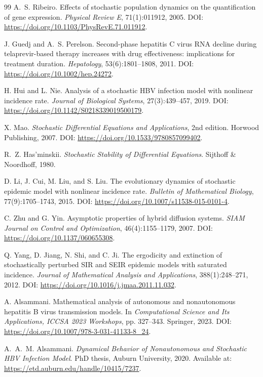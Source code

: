 \documentclass{article}
\begin{document}
\begin{thebibliography}{99}
A.~S. Ribeiro.
\newblock Effects of stochastic population dynamics on the quantification of gene expression.
\newblock \emph{Physical Review E}, 71(1):011912, 2005. DOI: \url{https://doi.org/10.1103/PhysRevE.71.011912}.

J. Guedj and A.~S. Perelson.
\newblock Second-phase hepatitis C virus RNA decline during telaprevir-based therapy increases with drug effectiveness: implications for treatment duration.
\newblock \emph{Hepatology}, 53(6):1801--1808, 2011. DOI: \url{https://doi.org/10.1002/hep.24272}.

H. Hui and L. Nie.
\newblock Analysis of a stochastic HBV infection model with nonlinear incidence rate.
\newblock \emph{Journal of Biological Systems}, 27(3):439--457, 2019. DOI: \url{https://doi.org/10.1142/S0218339019500179}.

X. Mao.
\newblock \emph{Stochastic Differential Equations and Applications}, 2nd edition.
\newblock Horwood Publishing, 2007. DOI: \url{https://doi.org/10.1533/9780857099402}.

R.~Z. Has'minskii.
\newblock \emph{Stochastic Stability of Differential Equations}.
\newblock Sijthoff \& Noordhoff, 1980.

D. Li, J. Cui, M. Liu, and S. Liu.
\newblock The evolutionary dynamics of stochastic epidemic model with nonlinear incidence rate.
\newblock \emph{Bulletin of Mathematical Biology}, 77(9):1705--1743, 2015. DOI: \url{https://doi.org/10.1007/s11538-015-0101-4}.

C. Zhu and G. Yin.
\newblock Asymptotic properties of hybrid diffusion systems.
\newblock \emph{SIAM Journal on Control and Optimization}, 46(4):1155--1179, 2007. DOI: \url{https://doi.org/10.1137/060655308}.

Q. Yang, D. Jiang, N. Shi, and C. Ji.
\newblock The ergodicity and extinction of stochastically perturbed SIR and SEIR epidemic models with saturated incidence.
\newblock \emph{Journal of Mathematical Analysis and Applications}, 388(1):248--271, 2012. DOI: \url{https://doi.org/10.1016/j.jmaa.2011.11.032}.

A. Alsammani.
\newblock Mathematical analysis of autonomous and nonautonomous hepatitis B virus transmission models.
\newblock In \emph{Computational Science and Its Applications, ICCSA 2023 Workshops}, pp. 327--343. Springer, 2023. DOI: \url{https://doi.org/10.1007/978-3-031-41133-8_24}.

A.~A.~M. Alsammani.
\newblock \emph{Dynamical Behavior of Nonautonomous and Stochastic HBV Infection Model}.
\newblock PhD thesis, Auburn University, 2020. Available at: \url{https://etd.auburn.edu/handle/10415/7237}.

\end{thebibliography}
\end{document}
